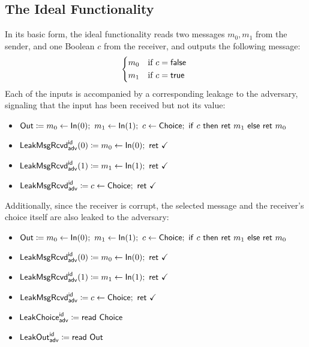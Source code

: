 \subsection{The Ideal Functionality}
In its basic form, the ideal functionality reads two messages $m_0,m_1$ from the sender, and one Boolean $c$ from the receiver, and outputs the following message:
\[\begin{cases*}
m_0 & \text{if $c = \false$} \\
m_1 & \text{if $c = \true$}
\end{cases*}\]
Each of the inputs is accompanied by a corresponding leakage to the adversary, signaling that the input has been received but not its value:
\begin{itemize}
\item $\Out \coloneqq m_0 \leftarrow \In(0); \ m_1 \leftarrow \In(1); \ c \leftarrow \Choice; \ \ifte{c}{\ret{m_1}}{\ret{m_0}}$
\item {\color{blue} $\LeakMsgRcvd^\id_\adv(0) \coloneqq m_0 \leftarrow \In(0); \ \ret{\checkmark}$}
\item {\color{blue} $\LeakMsgRcvd^\id_\adv(1) \coloneqq m_1 \leftarrow \In(1); \ \ret{\checkmark}$}
\item {\color{blue} $\LeakChoiceRcvd^\id_\adv \coloneqq c \leftarrow \Choice; \ \ret{\checkmark}$}
\end{itemize}
Additionally, since the receiver is corrupt, the selected message and the receiver's choice itself are also leaked to the adversary:
\begin{itemize}
\item $\Out \coloneqq m_0 \leftarrow \In(0); \ m_1 \leftarrow \In(1); \ c \leftarrow \Choice; \ \ifte{c}{\ret{m_1}}{\ret{m_0}}$
\item {\color{blue} $\LeakMsgRcvd^\id_\adv(0) \coloneqq m_0 \leftarrow \In(0); \ \ret{\checkmark}$}
\item {\color{blue} $\LeakMsgRcvd^\id_\adv(1) \coloneqq m_1 \leftarrow \In(1); \ \ret{\checkmark}$}
\item {\color{blue} $\LeakChoiceRcvd^\id_\adv \coloneqq c \leftarrow \Choice; \ \ret{\checkmark}$}
\item {\color{blue} $\mathsf{LeakChoice}^{\mathsf{id}}_{\mathsf{adv}} \coloneqq \mathsf{read} \ \mathsf{Choice}$}
\item {\color{blue} $\mathsf{LeakOut}^{\mathsf{id}}_{\mathsf{adv}} \coloneqq \mathsf{read} \ \mathsf{Out}$}
\end{itemize}

